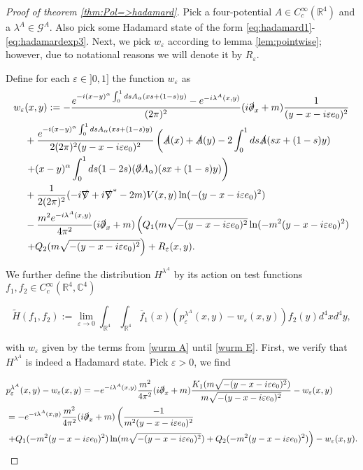 \documentclass[a4paper,11pt]{article}
\begin{document}
\begin{proof}[Proof of theorem \ref{thm:Pol=>hadamard}]
Pick a four-potential \(A\in C_c^\infty(\mathbb{R}^4)\)
and a \(\lambda^A\in\mathcal{G}^A\).
Also pick some Hadamard state of the form \eqref{eq:hadamard1}-\eqref{eq:hadamardexp3}.
Next, we pick \(w_\varepsilon\) according to lemma \ref{lem:pointwise}; however, due to notational reasons we will denote it by \(R_\varepsilon\).

Define for each \(\varepsilon \in ]0,1]\) the function \(w_\varepsilon\) as
\begin{align}\label{wurm A}
w_\varepsilon &(x,y):= -\frac{e^{-i (x-y)^\alpha\int_0^1 ds A_\alpha (x s + (1-s)y)}-e^{-i\lambda^A(x,y)}}{(2\pi)^2}(i\slashed{\partial}_x +m) \frac{1}{(y-x-i\varepsilon e_0)^2}\\
&+\frac{e^{-i (x-y)^\alpha\int_0^1 ds A_\alpha (x s + (1-s)y)}}{2(2\pi)^2 (y-x-i\varepsilon e_0)^2}\left( \slashed{A}(x)+\slashed{A}(y) -2 \int_0^1 ds \slashed{A}(sx +(1-s)y) \right.\\
&\left.+ (x-y)^\alpha \int_0^1 ds (1-2s)(\slashed{\partial}A_\alpha)(sx + (1-s)y) \right)\\
&+ \frac{1}{2(2\pi)^2} (-i\slashed{\nabla}+i\slashed{\nabla}^* -2m) V(x,y)\ln (-(y-x-i\varepsilon e_0)^2)\\\label{wurm E}
&-\frac{m^2 e^{-i \lambda^A(x,y)}}{4\pi^2} (i\slashed{\partial}_x+m)\left(Q_1(m\sqrt{-(y-x-i\varepsilon e_0)^2}\ln(-m^2(y-x-i\varepsilon e_0)^2)\right.\\
&\left.+Q_2(m\sqrt{-(y-x-i\varepsilon e_0)^2}\right) + R_\varepsilon(x,y).
\end{align}

We further define the distribution \(H^{\lambda^A}\) by its action on test functions 
\(f_1,f_2\in C_c^\infty(\mathbb{R}^4,\mathbb{C}^4)\)

\begin{equation}
\tilde{H}(f_1,f_2):=\lim_{\varepsilon \rightarrow 0} \int_{\mathbb{R}^4}\int_{\mathbb{R}^4} \overline{f}_1(x) (p_\varepsilon^{\lambda^A}(x,y)-w_\varepsilon(x,y)) f_2(y) d^4x d^4y,
\end{equation}

with \(w_\varepsilon\) given by the terms from \eqref{wurm A} until \eqref{wurm E}. First, we verify that \(H^{\lambda^A}\) is indeed a Hadamard state. Pick \(\varepsilon>0\), we find

\begin{align*}
&p_\varepsilon^{\lambda^A}(x,y)-w_\varepsilon(x,y)=-e^{-i\lambda^A(x,y)}\frac{m^2}{4\pi^2} (i\slashed{\partial}_x+m)
\frac{K_1(m\sqrt{-(y-x-i\varepsilon e_0)^2})}{m\sqrt{-(y-x-i\varepsilon e_0)^2}} - w_\varepsilon(x,y)\\
&=-e^{-i\lambda^A(x,y)}\frac{m^2}{4\pi^2} (i\slashed{\partial}_x+m) \left( \frac{-1}{m^2(y-x-i\varepsilon e_0)^2} \right.\\
&\left.+ Q_1(-m^2 (y-x-i\varepsilon e_0)^2) \ln (m\sqrt{-(y-x-i\varepsilon e_0)^2})
+ Q_2(-m^2 (y-x-i\varepsilon e_0)^2)\right) -w_\varepsilon(x,y).
\end{align*}


\end{proof}
\end{document}
